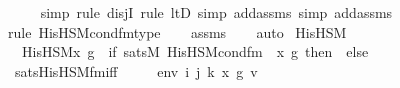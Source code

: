 \begin{isabellebody}
\ \ \ \ \isamarkupfalse%
{\isacharparenleft}{\kern0pt}simp{\isacharcomma}{\kern0pt}\ rule\ disjI{}{\isacharcomma}{\kern0pt}\ rule\ ltD{\isacharcomma}{\kern0pt}\ simp\ add{\isacharcolon}{\kern0pt}assms{\isacharcomma}{\kern0pt}\ simp\ add{\isacharcolon}{\kern0pt}assms{\isacharparenright}{\kern0pt}\isanewline
\ \ \isamarkupfalse%
{\isacharparenleft}{\kern0pt}rule\ His{\isacharunderscore}{\kern0pt}HS{\isacharunderscore}{\kern0pt}M{\isacharunderscore}{\kern0pt}cond{\isacharunderscore}{\kern0pt}fm{\isacharprime}{\kern0pt}{\isacharunderscore}{\kern0pt}type{\isacharparenright}{\kern0pt}\isanewline
\ \ \isamarkupfalse%
\ assms\isanewline
\ \ \isamarkupfalse%
\ auto%
\endisatagproof
{\isafoldproof}%
%
\isadelimproof
\isanewline
%
\endisadelimproof
\isanewline
{}\isamarkupfalse%
\ His{\isacharunderscore}{\kern0pt}HS{\isacharunderscore}{\kern0pt}M\ \ \ \ \ \ \ \ \ \ \ \ \ \ \ \ \ \ \ \ \ \ \ \isanewline
\ \ {\isachardoublequoteopen}His{\isacharunderscore}{\kern0pt}HS{\isacharunderscore}{\kern0pt}M{\isacharparenleft}{\kern0pt}x{\isacharprime}{\kern0pt}{\isacharcomma}{\kern0pt}\ g{\isacharparenright}{\kern0pt}\ {\isacharequal}{\kern0pt}\ {\isacharparenleft}{\kern0pt}if\ {\isacharparenleft}{\kern0pt}sats{\isacharparenleft}{\kern0pt}M{\isacharcomma}{\kern0pt}\ His{\isacharunderscore}{\kern0pt}HS{\isacharunderscore}{\kern0pt}M{\isacharunderscore}{\kern0pt}cond{\isacharunderscore}{\kern0pt}fm{\isacharparenleft}{\kern0pt}{}{\isacharcomma}{\kern0pt}\ {}{\isacharparenright}{\kern0pt}{\isacharcomma}{\kern0pt}\ {\isacharbrackleft}{\kern0pt}x{\isacharprime}{\kern0pt}{\isacharcomma}{\kern0pt}\ g{\isacharbrackright}{\kern0pt}{\isacharparenright}{\kern0pt}{\isacharparenright}{\kern0pt}\ then\ {}\ else\ {}{\isacharparenright}{\kern0pt}{\isachardoublequoteclose}\ \ \isanewline
\isanewline
{}\isamarkupfalse%
\ sats{\isacharunderscore}{\kern0pt}His{\isacharunderscore}{\kern0pt}HS{\isacharunderscore}{\kern0pt}M{\isacharunderscore}{\kern0pt}fm{\isacharunderscore}{\kern0pt}iff\ {\isacharcolon}{\kern0pt}\ \isanewline
\ \ \ env\ i\ j\ k\ x{\isacharprime}{\kern0pt}\ g\ v\isanewline

\end{isabellebody}
